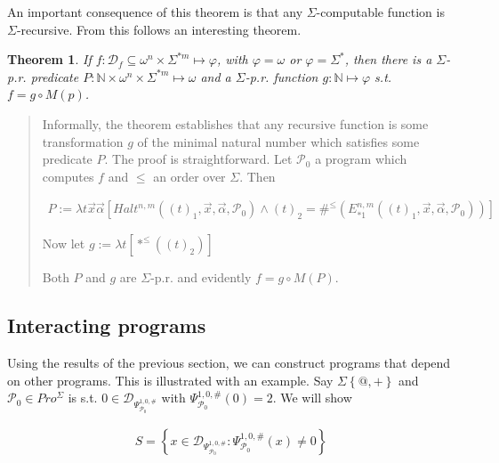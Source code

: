 \documentclass[a4paper, 12pt]{article}
\newtheorem{theorem}{Theorem}
\newtheorem{theorem}{Theorem}
\begin{document}
An important consequence of this theorem is that any $\Sigma$-computable
function is $\Sigma$-recursive. From this follows an interesting theorem. 

\begin{theorem}
    If $f : \mathcal{D}_f \subseteq \omega^{n} \times \Sigma^{*m} \mapsto
    \varphi$, with $\varphi = \omega$ or $\varphi = \Sigma^{*}$, then there is a
    $\Sigma$-p.r. predicate $P : \mathbb{N} \times \omega^{n} \times \Sigma^{*m}
    \mapsto \omega$ and a $\Sigma$-p.r. function $g : \mathbb{N} \mapsto
    \varphi$ s.t. $f = g \circ M(p)$.
\end{theorem}


\small
\begin{quote}

Informally, the theorem establishes that any recursive function is some transformation $g$
of the minimal natural number which satisfies some predicate $P$. The proof is
straightforward.  Let $\mathcal{P}_0$ a program which computes $f$ and $\leq$ an
order over $\Sigma$. Then 

\begin{align*}
    P := \lambda t \vec{x}\vec{\alpha} \left[  Halt^{n, m} \left( (t)_1,
    \vec{x}, \vec{\alpha}, \mathcal{P}_0 \right) \land (t)_2 = \#^{\leq} \left(
E_{* 1}^{n, m}\left( (t)_1, \vec{x}, \vec{\alpha}, \mathcal{P}_0 \right) \right)   \right]
\end{align*} 

Now let $g := \lambda t \left[ *^{\leq} \left( (t)_2 \right)   \right]$

Both $P$ and $g$ are $\Sigma$-p.r. and evidently $f = g \circ M(P)$.

\end{quote}
\normalsize



\subsection{Interacting programs}

Using the results of the previous section, we can construct programs that depend
on other programs. This is illustrated with an example. Say $\Sigma \left\{ @, +
\right\} $ and $\mathcal{P}_0 \in Pro^{\Sigma}$ is s.t. $0 \in
\mathcal{D}_{\Psi_{\mathcal{P_0}}^{1, 0, \#}}$ with $\Psi_{\mathcal{P}_0}^{1, 0,
\#}(0) = 2$. We will show 

\begin{align*}
    S = \left\{ x \in \mathcal{D}_{\Psi_{\mathcal{P}_0}^{1, 0, \#}} :
    \Psi_{\mathcal{P}_0}^{1, 0, \#}(x) \neq 0\right\} 
\end{align*}
\end{document}
